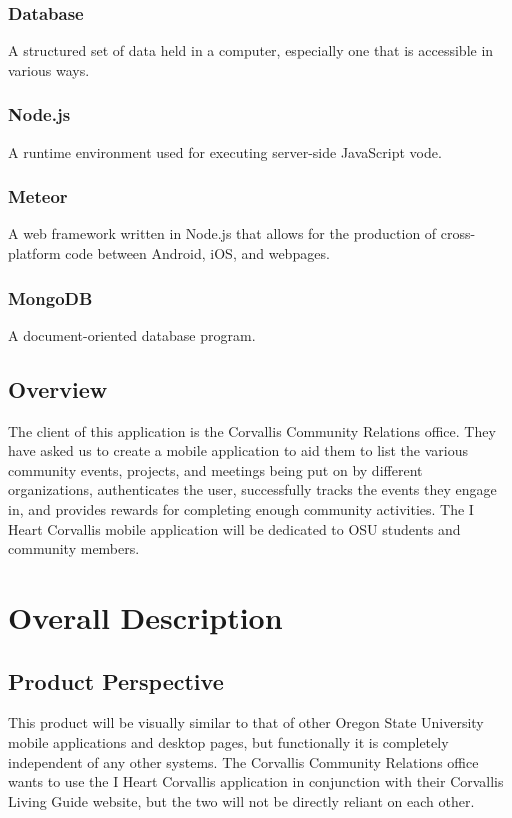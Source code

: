\documentclass[draftclsnofoot, onecolumn, 10pt, compsoc]{IEEEtran}
\begin{document}
			\subsubsection{Database} A structured set of data held in a computer, especially one that is accessible in various ways.
			\subsubsection{Node.js} A runtime environment used for executing server-side JavaScript vode.
			\subsubsection{Meteor} A web framework written in Node.js that allows for the production of cross-platform code between Android, iOS, and webpages.
			\subsubsection{MongoDB} A document-oriented database program.
					
		\subsection{Overview}
			The client of this application is the Corvallis Community Relations office. They have asked us to create a mobile application to aid them to list the various community events, projects, and meetings being put on by different organizations, authenticates the user, successfully tracks the events they engage in, and provides rewards for completing enough community activities. The I Heart Corvallis mobile application will be dedicated to OSU students and community members.  
	
	\section{Overall Description}
		\subsection{Product Perspective}
			This product will be visually similar to that of other Oregon State University mobile applications and desktop pages, but functionally it is completely independent of any other systems. The Corvallis Community Relations office wants to use the I Heart Corvallis application in conjunction with their Corvallis Living Guide website, but the two will not be directly reliant on each other.
		
\end{document}
